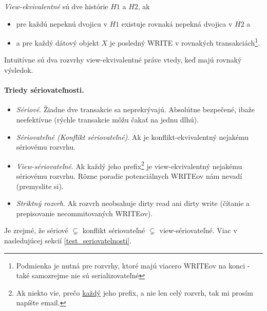 \documentclass[10pt,a4paper]{article}
\begin{document}
\emph{View-ekvivalentné} sú dve histórie $H1$ a $H2$, ak 
\begin{itemize}
\item pre každú nepeknú dvojicu v $H1$ existuje rovnaká nepekná dvojica v $H2$ a
\item a pre každý dátový objekt $X$ je posledný WRITE v rovnakých transakciách\footnote{Podmienka je nutná pre rozvrhy, ktoré majú viacero WRITEov na konci - také samozrejme nie sú serializovateľné}. 
\end{itemize}
Intuitívne sú dva rozvrhy view-ekvivalentné práve vtedy, keď majú rovnaký výsledok. 

\paragraph{Triedy sériovateľnosti.}
\begin{itemize}
\item \emph{Sériové}. Žiadne dve transakcie sa neprekrývajú. Absolútne bezpečené, ibaže neefektívne (rýchle transakcie môžu čakať na jednu dlhú).
\item \emph{Sériovateľné (Konflikt sériovateľné)}. Ak je konflikt-ekvivalentný nejakému sériovému rozvrhu. 
\item \emph{View-sériovateľné}. Ak každý jeho prefix\footnote{Ak niekto vie, prečo \underline{každý} jeho prefix, a nie len celý rozvrh, tak mi prosím napíšte email.} je view-ekvivalentný nejakému sériovému rozvrhu. Rôzne poradie potenciálnych WRITEov nám nevadí (premyslite si). 
\item \emph{Striktný rozvrh}. Ak rozvrh neobsahuje dirty read ani dirty write (čítanie a prepisovanie necommitovaných WRITEov). 
\end{itemize}

Je zrejmé, že sériové $\subsetneq$ konflikt sériovateľné $\subsetneq$ view-sériovateľné.
Viac v nasledujúcej sekcií \ref{test_seriovatelnosti}.
\end{document}
